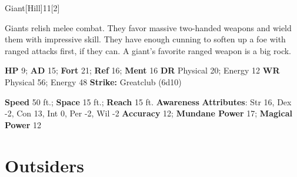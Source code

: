   \begin{monsection}{Giant}[Hill]{11}[2]
    \vspace{-1em}\vspace{-1em}
    \vspace{0em}

    
      Giants relish melee combat.
      They favor massive two-handed weapons and wield them with impressive skill.
      They have enough cunning to soften up a foe with ranged attacks first, if they can.
      A giant's favorite ranged weapon is a big rock.
    

    \begin{spellcontent}
      \begin{spelltargetinginfo}
        \pari \textbf{HP} 9;
          \textbf{AD} 15;
          \textbf{Fort} 21;
          \textbf{Ref} 16;
          \textbf{Ment} 16
        \pari \textbf{DR} Physical 20; Energy 12
        \pari \textbf{WR} Physical 56; Energy 48
        \pari \textbf{Strike:}
            Greatclub  (6d10)
      \end{spelltargetinginfo}
    \end{spellcontent}
    \begin{monsterfooter}
      \pari \textbf{Speed} 50 ft.;
        \textbf{Space} 15 ft.;
        \textbf{Reach} 15 ft.
      \pari \textbf{Awareness} 
      \pari \textbf{Attributes}:
        Str 16, Dex -2,
        Con 13, Int 0,
        Per -2, Wil -2
      \pari \textbf{Accuracy} 12;
        \textbf{Mundane Power} 17;
      \textbf{Magical Power} 12
    \end{monsterfooter}
  \end{monsection}
  
  
        \section{Outsiders}
      
